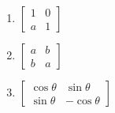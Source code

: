 \begin{multicols}{2}
\begin{enumerate}[1. ]
		\item $ \begin{bmatrix} 1 & 0 \\ a & 1 \end{bmatrix} $\\

		\item $ \begin{bmatrix} a & b \\ b & a \end{bmatrix} $

		\item $ \begin{bmatrix} \cos \theta & \sin \theta \\ \sin \theta & -\cos \theta \end{bmatrix} $\\
	\end{enumerate}
\end{multicols}






